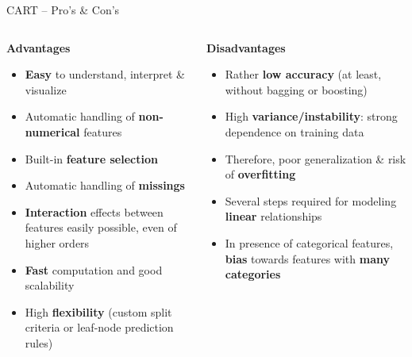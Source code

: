 \documentclass[11pt,compress,t,notes=noshow, xcolor=table]{beamer}
\newcommand{\highlight}[1]{\textcolor{highlightcol}{\textbf{#1}}}
\newcommand{\positem}{\item[$\highlight{+}$]}
\newcommand{\negitem}{\item[$\highlight{-}$]}
\begin{document}
\begin{frame}{CART -- Pro's \& Con's}

\footnotesize

\begin{columns}[onlytextwidth]
  \begin{column}{0.5\textwidth}
    \highlight{Advantages}
    \footnotesize
    \begin{itemize}
      \positem \textbf{Easy} to understand, interpret \& visualize
      \positem Automatic handling of \textbf{non-numerical} features
      \positem Built-in \textbf{feature selection}
      \positem Automatic handling of \textbf{missings} 
      \positem \textbf{Interaction} effects between features easily possible, 
      even of higher orders
      \positem \textbf{Fast} computation and good scalability
      \positem High \textbf{flexibility} (custom split criteria or leaf-node 
      prediction rules)   
    \end{itemize}
  \end{column}
  \begin{column}{0.5\textwidth}
    \highlight{Disadvantages}
    \footnotesize
    \begin{itemize}
      \negitem Rather \textbf{low accuracy} (at least, without bagging or 
      boosting)
      \negitem High \textbf{variance/instability}: strong dependence on training 
      data
      \negitem Therefore, poor generalization \& risk of \textbf{overfitting}
      \negitem Several steps required for modeling \textbf{linear} relationships
      \negitem In presence of categorical features, \textbf{bias} towards 
      features with \textbf{many categories}
    \end{itemize}
  \end{column}
\end{columns}

\vfill

\small


\end{frame}

\end{document}
